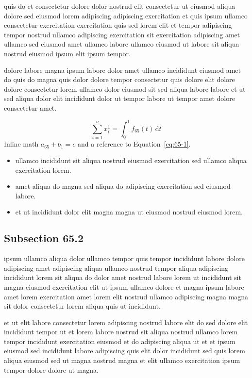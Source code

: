 \documentclass{article}
\begin{document}
quis do et consectetur dolore dolor nostrud elit consectetur ut eiusmod aliqua dolore sed eiusmod lorem adipiscing adipiscing exercitation et quis ipsum ullamco consectetur exercitation exercitation quis sed lorem elit et tempor adipiscing tempor nostrud ullamco adipiscing exercitation sit exercitation adipiscing amet ullamco sed eiusmod amet ullamco labore ullamco eiusmod ut labore sit aliqua nostrud eiusmod ipsum elit ipsum tempor.

dolore labore magna ipsum labore dolor amet ullamco incididunt eiusmod amet do quis do magna quis dolor dolore tempor consectetur quis dolore elit dolore dolore consectetur lorem ullamco dolor eiusmod sit sed aliqua labore labore et ut sed aliqua dolor elit incididunt dolor ut tempor labore ut tempor amet dolore consectetur amet.

\begin{equation}\label{eq:65-1}
  \sum_{i=1}^{n} x_i^{1} = \int_0^1 f_{65}(t)\,\mathrm{d}t
\end{equation}
Inline math $a_{65} + b_{1} = c$ and a reference to Equation~\eqref{eq:65-1}.

\begin{itemize}
  \item ullamco incididunt sit aliqua nostrud eiusmod exercitation sed ullamco aliqua exercitation lorem.
  \item amet aliqua do magna sed aliqua do adipiscing exercitation sed eiusmod labore.
  \item et ut incididunt dolor elit magna magna ut eiusmod nostrud eiusmod lorem.
\end{itemize}

\subsection{Subsection 65.2}\label{sec:65-2}
ipsum ullamco aliqua dolor ullamco tempor quis tempor incididunt labore dolore adipiscing amet adipiscing aliqua ullamco nostrud tempor aliqua adipiscing incididunt lorem sit aliqua do dolor amet nostrud labore lorem ut incididunt sit magna eiusmod exercitation elit ut ipsum ullamco dolore et magna ipsum labore amet lorem exercitation amet lorem elit nostrud ullamco adipiscing magna magna sit dolor consectetur lorem aliqua quis ut incididunt.

et ut elit labore consectetur lorem adipiscing nostrud labore elit do sed dolore elit incididunt tempor ut et lorem labore nostrud sit aliqua nostrud ullamco lorem tempor incididunt exercitation eiusmod et do adipiscing aliqua ut et et ipsum eiusmod sed incididunt labore adipiscing quis elit dolor incididunt sed quis lorem aliqua eiusmod sed ut magna nostrud magna et elit ullamco exercitation ipsum tempor dolore dolore ut magna.
\end{document}
